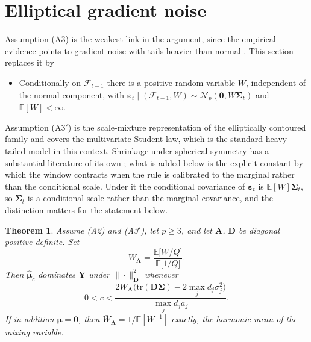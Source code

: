 \documentclass[pdflatex,sn-mathphys-num]{sn-jnl}%
\theoremstyle{thmstyleone}%
\newtheorem{theorem}{Theorem}%
\theoremstyle{thmstyletwo}%
\theoremstyle{thmstylethree}%
\newcommand{\tr}{\mathrm{tr}}
\newcommand{\E}{\mathbb{E}}
\begin{document}
\section{Elliptical gradient noise}
\label{sec:elliptical}

Assumption (A3) is the weakest link in the argument, since the empirical evidence points to gradient noise with tails heavier than normal \cite{simsekli2019, panigrahi2019, gurbuzbalaban2021}. This section replaces it by

\begin{itemize}
\item[(A3$'$)] Conditionally on $\mathcal F_{t-1}$ there is a positive random variable $W$, independent of the normal component, with $\bm\varepsilon_t\mid(\mathcal F_{t-1},W)\sim\mathcal N_p(\bm 0,W\bm\Sigma_t)$ and $\E[W]<\infty$.
\end{itemize}

Assumption (A3$'$) is the scale-mixture representation of the elliptically contoured family \cite{fang1990} and covers the multivariate Student law, which is the standard heavy-tailed model in this context. Shrinkage under spherical symmetry has a substantial literature of its own \cite{strawderman1974, brandwein1990, cellier1995, cellier1995b, brandwein2012}; what is added below is the explicit constant by which the window contracts when the rule is calibrated to the marginal rather than the conditional scale. Under it the conditional covariance of $\bm\varepsilon_t$ is $\E[W]\bm\Sigma_t$, so $\bm\Sigma_t$ is a conditional scale rather than the marginal covariance, and the distinction matters for the statement below.

\begin{theorem}
\label{thm:elliptical}
Assume (A2) and (A3$'$), let $p\ge3$, and let $\bm A$, $\bm D$ be diagonal positive definite. Set
\begin{equation}
\bar W_{\bm A}=\frac{\E\bigl[W/Q\bigr]}{\E\bigl[1/Q\bigr]} .
\end{equation}
Then $\hat{\bm\mu}_c$ dominates $\bm Y$ under $\|\cdot\|^2_{\bm D}$ whenever
\begin{equation}
\label{eq:elliptical_window}
0<c<\frac{2\bar W_{\bm A}\bigl(\tr(\bm D\bm\Sigma)-2\max_j d_j\sigma^2_j\bigr)}{\max_j d_j a_j} .
\end{equation}
If in addition $\bm\mu=\bm 0$, then $\bar W_{\bm A}=1/\E[W^{-1}]$ exactly, the harmonic mean of the mixing variable.
\end{theorem}
\end{document}
